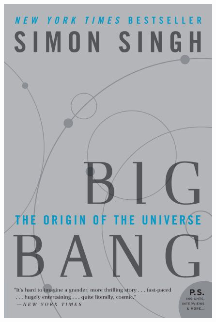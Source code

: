\documentclass{tufte-handout}
\makeatletter
\newcommand{\varcaption}[2][0pt]{%
  \gsetlength{\@tufte@caption@vertical@offset}{-#1}%
  \gdef\@tufte@stored@varcaption{#2}%
}
\gdef\@tufte@stored@varcaption{} %
\makeatother
\begin{document}
\begin{marginfigure}[-15\baselineskip]
   \includegraphics[width=\linewidth]{images/big_bang.jpg}
   \varcaption{\href{https://www.harpercollins.com/9780007162215/big-bang/}{Publisher Link}, \href{https://www.amazon.com/Big-Bang-Universe-Simon-Singh/dp/0007162219/}{Amazon Link}}
\end{marginfigure}
\end{document}
